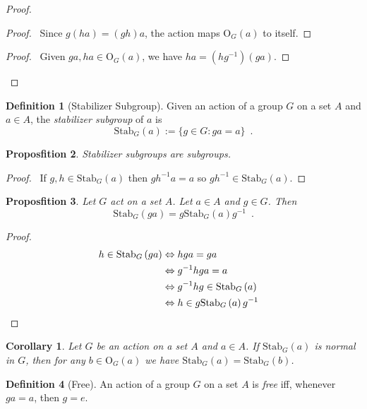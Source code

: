 \documentclass{book}
\let\qed\relax
\newtheorem{prop}{Proposfition}[chapter]
\newtheorem{cor}{Corollary}[prop]
\theoremstyle{definition}
\newtheorem{df}[prop]{Definition}
\newcommand{\inv}[1]{\ensuremath{{#1}^{-1}}}
\newcommand{\Stab}[2]{\ensuremath{\mathrm{Stab}_{#1} \left( {#2} \right)}}
\begin{document}
\begin{proof}
\pf
{}
\begin{proof}
\pf\ Since $g(ha) = (gh)a$, the action maps $\mathrm{O}_G(a)$ to itself.
\end{proof}
\begin{proof}
\pf\ Given $ga, ha \in \mathrm{O}_G(a)$, we have $ha = (h\inv{g})(ga)$.
\end{proof}
\qed
\end{proof}

\begin{df}[Stabilizer Subgroup]
Given an action of a group $G$ on a set $A$ and $a \in A$, the \emph{stabilizer subgroup} of $a$ is
\[ \Stab{G}{a} := \{ g \in G : ga = a \} \enspace . \]
\end{df}

\begin{prop}
Stabilizer subgroups are subgroups.
\end{prop}

\begin{proof}
\pf\ If $g,h \in \Stab{G}{a}$ then $g \inv{h} a = a$ so $g \inv{h} \in \Stab{G}{a}$. \qed
\end{proof}

\begin{prop}
Let $G$ act on a set $A$. Let $a \in A$ and $g \in G$. Then
\[ \Stab{G}{ga} = g \Stab{G}{a} \inv{g} \enspace . \]
\end{prop}

\begin{proof}
\pf
\begin{align*}
h \in \Stab{G}{ga} & \Leftrightarrow hga = ga \\
& \Leftrightarrow \inv{g}hga = a \\
& \Leftrightarrow \inv{g}hg \in \Stab{G}{a} \\
& \Leftrightarrow h \in g \Stab{G}{a} \inv{g} & \qed
\end{align*}
\end{proof}

\begin{cor}
Let $G$ be an action on a set $A$ and $a \in A$. If $\Stab{G}{a}$ is normal in $G$, then for any $b \in \mathrm{O}_G(a)$ we have $\Stab{G}{a} = \Stab{G}{b}$.
\end{cor}

\begin{df}[Free]
An action of a group $G$ on a set $A$ is \emph{free} iff, whenever $ga = a$, then $g = e$.
\end{df}
\end{document}
